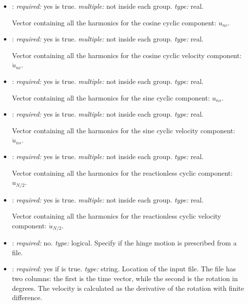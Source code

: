 \begin{itemize}
\begin{itemize}
    Velocity of the collective component: $\dot{u}_0$.

    \item {}: \textit{required:} yes  is true. 
    \textit{multiple:} not inside each  group. \textit{type:} real. 

    Vector containing all the harmonics for the cosine cyclic component: $u_{nc}$. 

    \item {}: \textit{required:} yes  is true. 
    \textit{multiple:} not inside each  group. \textit{type:} real. 

    Vector containing all the harmonics for the cosine cyclic velocity component: $\dot{u}_{nc}$. 
    
    \item {}: \textit{required:} yes  is true. 
    \textit{multiple:} not inside each  group. \textit{type:} real. 

    Vector containing all the harmonics for the sine cyclic component: $u_{ns}$. 

    \item {}: \textit{required:} yes  is true. 
    \textit{multiple:} not inside each  group. \textit{type:} real. 

    Vector containing all the harmonics for the sine cyclic velocity component: $\dot{u}_{ns}$. 

    \item {}: \textit{required:} yes  is true. 
    \textit{multiple:} not inside each  group. \textit{type:} real. 

    Vector containing all the harmonics for the reactionless cyclic component: $u_{N/2}$. 

    \item {}: \textit{required:} yes  is true. 
    \textit{multiple:} not inside each  group. \textit{type:} real. 

    Vector containing all the harmonics for the reactionless cyclic velocity component: $\dot{u}_{N/2}$. 
    
    \item {}: \textit{required:} no. \textit{type:} logical. 
    Specify if the hinge motion is prescribed from a file. 

    \item {}: \textit{required:} yes if  is true. \textit{type:} string.
    Location of the input file. The file has two columns: the first is the time vector, while the second is the rotation in degrees.
    The velocity is calculated as the derivative of the rotation with finite difference.  
    
    \end{itemize}
\end{itemize}

